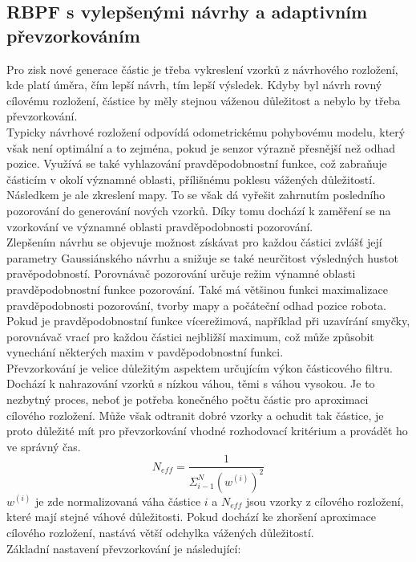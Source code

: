 \documentclass[11pt]{article}
\begin{document}
\subsection{RBPF s vylepšenými návrhy a adaptivním převzorkováním}
Pro zisk nové generace částic je třeba vykreslení vzorků z návrhového rozložení, kde platí úměra, čím lepší návrh, tím lepší výsledek. Kdyby byl návrh rovný cílovému rozložení, částice by měly stejnou váženou důležitost a nebylo by třeba převzorkování. \\
\indent Typicky návrhové rozložení odpovídá odometrickému pohybovému modelu, který však není optimální a to zejména, pokud je senzor výrazně přesnější než odhad pozice. Využívá se také vyhlazování pravděpodobnostní funkce, což zabraňuje částicím v okolí významné oblasti, přílišnému poklesu vážených důležitostí. Následkem je ale zkreslení mapy. To se však dá vyřešit zahrnutím posledního pozorování do generování nových vzorků. Díky tomu dochází k zaměření se na vzorkování ve významné oblasti pravděpodobnosti pozorování.\\
\indent Zlepšením návrhu se objevuje možnost získávat pro každou částici zvlášť její parametry Gaussiánského návrhu a snižuje se také neurčitost výsledných hustot pravěpodobností. Porovnávač pozorování určuje režim výnamné oblasti pravděpodobnostní funkce pozorování. Také má většinou funkci maximalizace pravděpodobnosti pozorování, tvorby mapy a počáteční odhad pozice robota. Pokud je pravděpodobnostní funkce vícerežimová, například při uzavírání smyčky, porovnávač vrací pro každou částici nejbližší maximum, což může způsobit vynechání některých maxim v pavděpodobnostní funkci.\\
\indent Převzorkování je velice důležitým aspektem určujícím výkon částicového filtru. Dochází k nahrazování vzorků s nízkou váhou, těmi s váhou vysokou. Je to nezbytný proces, neboť je potřeba konečného počtu částic pro aproximaci cílového rozložení. Může však odtranit dobré vzorky a ochudit tak částice, je proto důležité mít pro převzorkování vhodné rozhodovací kritérium a provádět ho ve správný čas. 
\begin{equation}
	N_{eff}=\frac{1}{\varSigma_{i-1}^N(w^{(i)})^2}
\end{equation} 
$w^{(i)}$ je zde normalizovaná váha částice $i$ a $N_{eff}$ jsou vzorky z cílového rozložení, které mají stejné váhové důležitosti. Pokud dochází ke zhoršení aproximace cílového rozložení, nastává větší odchylka vážených důležitostí.\\
Základní nastavení převzorkování je následující:
\end{document}

